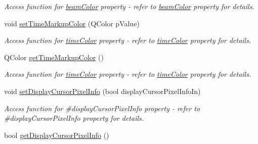 \begin{DoxyCompactItemize}
\begin{DoxyCompactList}\small\item\em Access function for \hyperlink{classQEImage_ae69b7be04428ccdad5dffceae756f98f}{beamColor} property -\/ refer to \hyperlink{classQEImage_ae69b7be04428ccdad5dffceae756f98f}{beamColor} property for details. \end{DoxyCompactList}\item 
\hypertarget{classQEImage_ac8877c0ed25e76c5cd5c322cb0203aa8}{
void \hyperlink{classQEImage_ac8877c0ed25e76c5cd5c322cb0203aa8}{setTimeMarkupColor} (QColor pValue)}
\label{classQEImage_ac8877c0ed25e76c5cd5c322cb0203aa8}

\begin{DoxyCompactList}\small\item\em Access function for \hyperlink{classQEImage_a8ee7300a0ecea621cd6c7196e36cab3f}{timeColor} property -\/ refer to \hyperlink{classQEImage_a8ee7300a0ecea621cd6c7196e36cab3f}{timeColor} property for details. \end{DoxyCompactList}\item 
\hypertarget{classQEImage_a82645c7945865953658d36e70bb44bab}{
QColor \hyperlink{classQEImage_a82645c7945865953658d36e70bb44bab}{getTimeMarkupColor} ()}
\label{classQEImage_a82645c7945865953658d36e70bb44bab}

\begin{DoxyCompactList}\small\item\em Access function for \hyperlink{classQEImage_a8ee7300a0ecea621cd6c7196e36cab3f}{timeColor} property -\/ refer to \hyperlink{classQEImage_a8ee7300a0ecea621cd6c7196e36cab3f}{timeColor} property for details. \end{DoxyCompactList}\item 
\hypertarget{classQEImage_ae1cc310f23bba59fd33b149ddd1382ff}{
void \hyperlink{classQEImage_ae1cc310f23bba59fd33b149ddd1382ff}{setDisplayCursorPixelInfo} (bool displayCursorPixelInfoIn)}
\label{classQEImage_ae1cc310f23bba59fd33b149ddd1382ff}

\begin{DoxyCompactList}\small\item\em Access function for \#displayCursorPixelInfo property -\/ refer to \#displayCursorPixelInfo property for details. \end{DoxyCompactList}\item 
\hypertarget{classQEImage_a3aae0822ee6d65aa6d3cafacbee6c1bd}{
bool \hyperlink{classQEImage_a3aae0822ee6d65aa6d3cafacbee6c1bd}{getDisplayCursorPixelInfo} ()}
\label{classQEImage_a3aae0822ee6d65aa6d3cafacbee6c1bd}


\end{DoxyCompactItemize}
